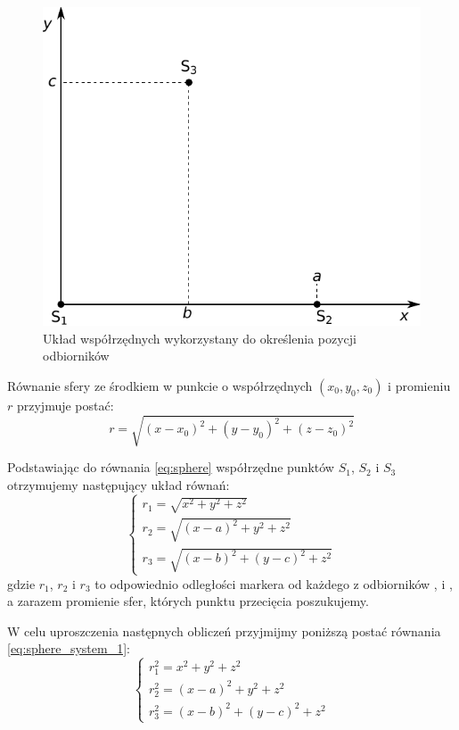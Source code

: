 \begin{figure}
  \includegraphics[width=\textwidth]{gfx/diagramy/schemat_uklad_wspolrzednych_clipped}
  \caption{Układ współrzędnych wykorzystany do określenia pozycji odbiorników}
  \label{fig:schema_coordinates}
\end{figure}

Równanie sfery ze środkiem w punkcie o współrzędnych $(x_0, y_0, z_0)$ i promieniu $r$ przyjmuje postać:
\begin{equation}
 r = \sqrt{(x - x_0)^2 + (y - y_0)^2 + (z - z_0)^2}
 \label{eq:sphere}
\end{equation}

Podstawiając do równania \ref{eq:sphere} współrzędne punktów $S_1$, $S_2$ i $S_3$ otrzymujemy następujący układ równań:
\begin{equation}
 \begin{cases}
  r_1 = \sqrt{x^2 + y^2 + z^2} \\
  r_2 = \sqrt{(x - a)^2 + y^2 + z^2} \\
  r_3 = \sqrt{(x - b)^2 + (y - c)^2 + z^2}
 \end{cases}
 \label{eq:sphere_system_1}
\end{equation}
gdzie $r_1$, $r_2$ i $r_3$ to odpowiednio odległości markera od każdego z odbiorników ,  i , a zarazem promienie sfer, których punktu przecięcia poszukujemy.

W celu uproszczenia następnych obliczeń przyjmijmy poniższą postać równania \ref{eq:sphere_system_1}:
\begin{equation}
 \begin{cases}
  r_1^2 = x^2 + y^2 + z^2 \\
  r_2^2 = (x - a)^2 + y^2 + z^2 \\
  r_3^2 = (x - b)^2 + (y - c)^2 + z^2
 \end{cases}
 \label{eq:sphere_system_2}
\end{equation}

